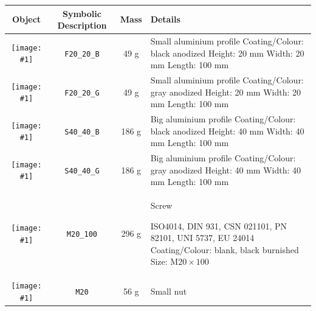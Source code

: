 \newcommand{\imageView}[1]{\texttt{[image: \#1]}}
{
\newcommand{\rowpadding}{0.4cm}
\setlength\extrarowheight{\rowpadding}
\begin{table}[p]

\begin{tabular}{|c|c|c|m{8cm}|}
\hline
Object & Symbolic Description & Mass & Details \\
\hline

\imageView{./images/F20_20_B.jpg} & \texttt{F20\_20\_B} & 49 g & Small aluminium profile \newline
 Coating/Colour: black anodized\newline
 Height: 20 mm \newline
 Width: 20 mm \newline
 Length: 100 mm \\ [\rowpadding]
\hline

\imageView{./images/F20_20_G.jpg} & \texttt{F20\_20\_G} & 49 g & Small aluminium profile \newline
 Coating/Colour: gray anodized\newline
 Height: 20 mm \newline
 Width: 20 mm \newline
 Length: 100 mm \\ [\rowpadding]
\hline

\imageView{./images/S40_40_B.jpg} & \texttt{S40\_40\_B} & 186 g & Big aluminium profile\newline
 Coating/Colour: black anodized\newline
 Height: 40 mm \newline
 Width: 40 mm \newline
 Length: 100 mm \\ [\rowpadding]
\hline

\imageView{./images/S40_40_G.jpg} & \texttt{S40\_40\_G} & 186 g & Big aluminium profile \newline
 Coating/Colour:  gray anodized\newline
 Height: 40 mm \newline
 Width: 40 mm \newline
 Length: 100 mm \\ [\rowpadding]
\hline
\imageView{./images/M20_100.jpg} & \texttt{M20\_100} & 296 g & Screw\newline

 ISO4014, DIN 931, CSN 021101, PN 82101, UNI 5737, EU 24014 \newline
 Coating/Colour: blank, black burnished \newline
 Size: M$20\times 100$ \\ [\rowpadding]
\hline
\imageView{./images/M20.jpg} & \texttt{M20} & 56 g & Small nut\newline


\end{tabular}
\end{table}}
